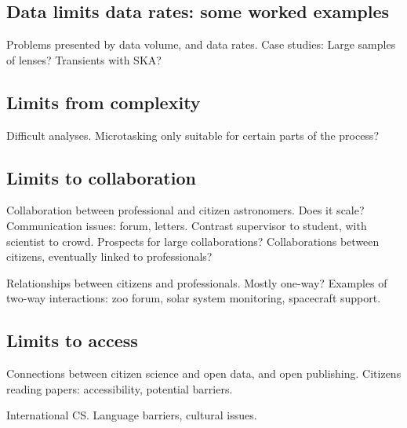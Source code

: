 \documentclass{ar2e}
\begin{document}

\subsection{Data limits data rates: some worked examples}
\label{sec:limits:data}

Problems presented by data volume, and data rates. 
Case studies: Large samples of lenses?  Transients with SKA? 



\subsection{Limits from complexity}
\label{sec:limits:complexity}

Difficult analyses. Microtasking only suitable for certain parts of the process?



\subsection{Limits to collaboration}
\label{sec:limits:collab}

Collaboration between professional and citizen astronomers. Does it scale?
Communication issues: forum, letters. Contrast supervisor to student, with
scientist to crowd. Prospects for large collaborations? Collaborations between
citizens, eventually linked to professionals?

Relationships between citizens and professionals. Mostly one-way? Examples of
two-way interactions: zoo forum, solar system monitoring, spacecraft support.



\subsection{Limits to access}
\label{sec:limits:access}

Connections between citizen science and open data, and open publishing. 
Citizens reading papers: accessibility, potential barriers. 

International CS. Language barriers, cultural issues. 
\end{document}
